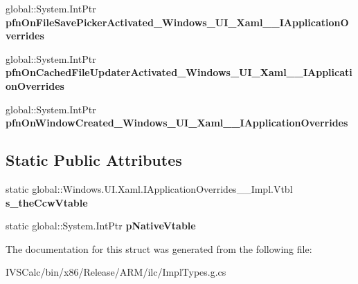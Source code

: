 \begin{DoxyCompactItemize}
global\+::\+System.\+Int\+Ptr {\bfseries pfn\+On\+File\+Save\+Picker\+Activated\+\_\+\+Windows\+\_\+\+U\+I\+\_\+\+Xaml\+\_\+\+\_\+\+I\+Application\+Overrides}
\item 
\mbox{\label{struct_windows_1_1_u_i_1_1_xaml_1_1_i_application_overrides_____impl_1_1_vtbl_a18180d88090611e20a509521b05807e3}} 
global\+::\+System.\+Int\+Ptr {\bfseries pfn\+On\+Cached\+File\+Updater\+Activated\+\_\+\+Windows\+\_\+\+U\+I\+\_\+\+Xaml\+\_\+\+\_\+\+I\+Application\+Overrides}
\item 
\mbox{\label{struct_windows_1_1_u_i_1_1_xaml_1_1_i_application_overrides_____impl_1_1_vtbl_a83e4204f57751b54ff64c3d617c80632}} 
global\+::\+System.\+Int\+Ptr {\bfseries pfn\+On\+Window\+Created\+\_\+\+Windows\+\_\+\+U\+I\+\_\+\+Xaml\+\_\+\+\_\+\+I\+Application\+Overrides}
\end{DoxyCompactItemize}
\subsection*{Static Public Attributes}
\begin{DoxyCompactItemize}
\item 
\mbox{\label{struct_windows_1_1_u_i_1_1_xaml_1_1_i_application_overrides_____impl_1_1_vtbl_af3f3e1982701c10f62308f53225b7b24}} 
static global\+::\+Windows.\+U\+I.\+Xaml.\+I\+Application\+Overrides\+\_\+\+\_\+\+Impl.\+Vtbl {\bfseries s\+\_\+the\+Ccw\+Vtable}
\item 
\mbox{\label{struct_windows_1_1_u_i_1_1_xaml_1_1_i_application_overrides_____impl_1_1_vtbl_a519b6f51a28bce6a635adafff725d746}} 
static global\+::\+System.\+Int\+Ptr {\bfseries p\+Native\+Vtable}
\end{DoxyCompactItemize}


The documentation for this struct was generated from the following file\+:\begin{DoxyCompactItemize}
\item 
I\+V\+S\+Calc/bin/x86/\+Release/\+A\+R\+M/ilc/Impl\+Types.\+g.\+cs\end{DoxyCompactItemize}
